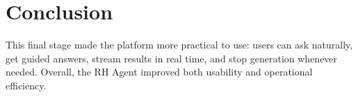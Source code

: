                                                                                                                                                                 \section{Conclusion}
                                                                                                                                                                This final stage made the platform more practical to use: users can ask naturally, get guided answers, stream results in real time, and stop generation whenever needed. Overall, the RH Agent improved both usability and operational efficiency.
                                                                                                                                                                